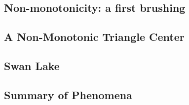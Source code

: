 

\subsection{Non-monotonicity: a first brushing}
\label{sec:act}


\subsection{A Non-Monotonic Triangle Center}
\label{sec:x88}


\subsection{Swan Lake}
\label{sec:swan-lake}


\subsection{Summary of Phenomena}
\label{sec:inter-summary}


